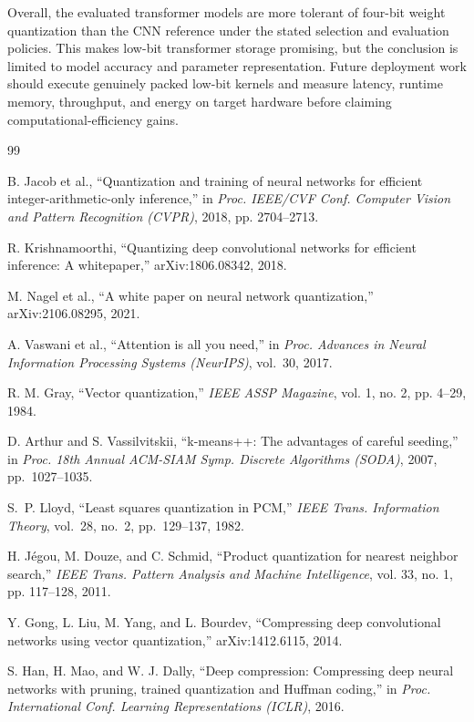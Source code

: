 \documentclass[conference]{IEEEtran}
\begin{document}
Overall, the evaluated transformer models are more tolerant of four-bit weight quantization than the CNN reference under the stated selection and evaluation policies. This makes low-bit transformer storage promising, but the conclusion is limited to model accuracy and parameter representation. Future deployment work should execute genuinely packed low-bit kernels and measure latency, runtime memory, throughput, and energy on target hardware before claiming computational-efficiency gains.

\FloatBarrier

\begin{thebibliography}{99}

B. Jacob et al., ``Quantization and training of neural networks for efficient integer-arithmetic-only inference,'' in \emph{Proc. IEEE/CVF Conf. Computer Vision and Pattern Recognition (CVPR)}, 2018, pp. 2704--2713.

R. Krishnamoorthi, ``Quantizing deep convolutional networks for efficient inference: A whitepaper,'' arXiv:1806.08342, 2018.

M. Nagel et al., ``A white paper on neural network quantization,'' arXiv:2106.08295, 2021.

A. Vaswani et al., ``Attention is all you need,'' in \emph{Proc. Advances in Neural Information Processing Systems (NeurIPS)}, vol.~30, 2017.

R. M. Gray, ``Vector quantization,'' \emph{IEEE ASSP Magazine}, vol. 1, no. 2, pp. 4--29, 1984.

D. Arthur and S. Vassilvitskii, ``k-means{+}{+}: The advantages of careful seeding,'' in \emph{Proc. 18th Annual ACM-SIAM Symp. Discrete Algorithms (SODA)}, 2007, pp.~1027--1035.

S.~P. Lloyd, ``Least squares quantization in PCM,'' \emph{IEEE Trans. Information Theory}, vol.~28, no.~2, pp.~129--137, 1982.

H. J\'egou, M. Douze, and C. Schmid, ``Product quantization for nearest neighbor search,'' \emph{IEEE Trans. Pattern Analysis and Machine Intelligence}, vol. 33, no. 1, pp. 117--128, 2011.

Y. Gong, L. Liu, M. Yang, and L. Bourdev, ``Compressing deep convolutional networks using vector quantization,'' arXiv:1412.6115, 2014.

S. Han, H. Mao, and W. J. Dally, ``Deep compression: Compressing deep neural networks with pruning, trained quantization and Huffman coding,'' in \emph{Proc. International Conf. Learning Representations (ICLR)}, 2016.


\end{thebibliography}
\end{document}
